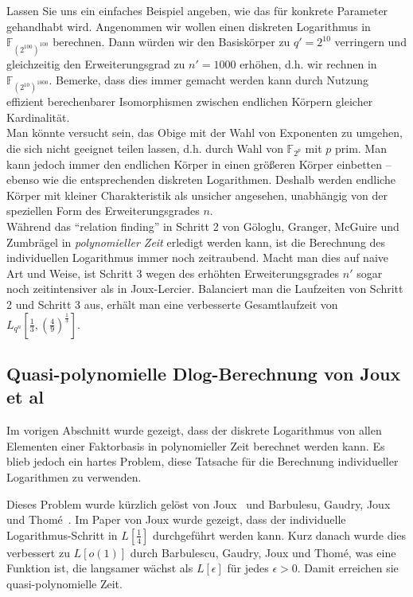 \begin{refsegment}
Lassen Sie uns ein einfaches Beispiel angeben, wie das für konkrete Parameter gehandhabt wird. Angenommen wir wollen einen diskreten Logarithmus in $\mathbb{F}_{(2^{100})^{100}}$ berechnen. Dann würden wir den Basiskörper zu $q'=2^{10}$ verringern und gleichzeitig den Erweiterungsgrad zu $n'=1000$ erhöhen, d.h. wir rechnen in $\mathbb{F}_{(2^{10})^{1000}}$. Bemerke, dass dies immer gemacht werden kann durch Nutzung effizient berechenbarer Isomorphismen zwischen endlichen Körpern gleicher Kardinalität.\\[0.1cm]

 Man könnte versucht sein, das Obige mit der Wahl von Exponenten zu umgehen, die sich nicht geeignet teilen lassen, d.h. durch Wahl von $\mathbb{F}_{2^p}$ mit $p$ prim. Man kann jedoch immer den endlichen Körper in einen größeren Körper einbetten -- ebenso wie die entsprechenden diskreten Logarithmen. Deshalb werden endliche Körper mit kleiner Charakteristik als unsicher angesehen, unabhängig von der speziellen Form des Erweiterungsgrades $n$.\\[0.1cm]

Während das "`relation finding"' in Schritt 2 von G\"ologlu, Granger, McGuire und Zumbr\"agel in {\em polynomieller Zeit} erledigt werden kann, ist die Berechnung des individuellen Logarithmus immer noch zeitraubend. Macht man dies auf naive Art und Weise, ist Schritt 3 wegen des erhöhten Erweiterungsgrades $n'$ sogar noch zeitintensiver als in Joux-Lercier. Balanciert man die Laufzeiten von Schritt 2 und Schritt 3 aus, erhält man eine verbesserte Gesamtlaufzeit von $L_{q^n}[\frac 1 3, (\frac 4 9)^{\frac 1 3}]$.


\subsection{Quasi-polynomielle Dlog-Berechnung von Joux et al}

Im vorigen Abschnitt wurde gezeigt, dass der diskrete Logarithmus von allen Elementen einer Faktorbasis in polynomieller Zeit berechnet werden kann. Es blieb jedoch ein hartes Problem, diese Tatsache für die Berechnung individueller Logarithmen zu verwenden.

Dieses Problem wurde kürzlich gelöst von Joux~\cite{Joux2013} und Barbulesu, Gaudry, Joux und Thom\'e~\cite{BGJT2013}. Im Paper von Joux wurde gezeigt, dass der individuelle Logarithmus-Schritt in $L[\frac 1 4]$ durchgeführt werden kann. Kurz danach wurde dies verbessert zu $L[o(1)]$ durch Barbulescu, Gaudry, Joux und Thom\'e, was eine Funktion ist, die langsamer wächst als $L[\epsilon]$ für jedes $\epsilon > 0$. Damit erreichen sie quasi-polynomielle Zeit.


\end{refsegment}
